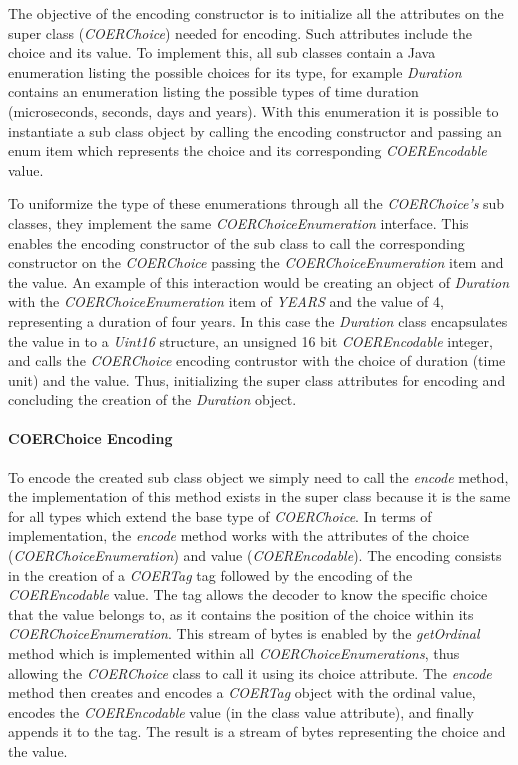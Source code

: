 The objective of the encoding constructor is to initialize all the attributes on the super class (\textit{COERChoice}) needed for encoding. Such attributes include the choice and its value. To implement this, all sub classes contain a Java enumeration listing the possible choices for its type, for example \textit{Duration} contains an enumeration listing the possible types of time duration (microseconds, seconds, days and years). With this enumeration it is possible to instantiate a sub class object by calling the encoding constructor and passing an enum item which represents the choice and its corresponding \textit{COEREncodable} value. 

To uniformize the type of these enumerations through all the \textit{COERChoice's} sub classes, they implement the same \textit{COERChoiceEnumeration} interface. This enables the encoding constructor of the sub class to call the corresponding constructor on the \textit{COERChoice} passing the \textit{COERChoiceEnumeration} item and the value. An example of this interaction would be creating an object of \textit{Duration} with the \textit{COERChoiceEnumeration} item of \textit{YEARS} and the value of 4, representing a duration of four years. In this case the \textit{Duration} class encapsulates the value in to a \textit{Uint16} structure, an unsigned 16 bit \textit{COEREncodable} integer, and calls the \textit{COERChoice} encoding contrustor with the choice of duration (time unit) and the value. Thus, initializing the super class attributes for encoding and concluding the creation of the \textit{Duration} object. 


\paragraph{COERChoice Encoding}
To encode the created sub class object we simply need to call the \textit{encode} method, the implementation of this method exists in the super class because it is the same for all types which extend the base type of \textit{COERChoice}. In terms of implementation, the \textit{encode} method works with the attributes of the choice (\textit{COERChoiceEnumeration}) and value (\textit{COEREncodable}). The encoding consists in the creation of a \textit{COERTag} tag followed by the encoding of the \textit{COEREncodable} value. The tag allows the decoder to know the specific choice that the value belongs to, as it contains the position of the choice within its \textit{COERChoiceEnumeration}. This stream of bytes is enabled by the \textit{getOrdinal} method which is implemented within all \textit{COERChoiceEnumerations}, thus allowing the \textit{COERChoice} class to call it using its choice attribute. The \textit{encode} method then creates and encodes a \textit{COERTag} object with the ordinal value, encodes the \textit{COEREncodable} value (in the class value attribute), and finally appends it to the tag. The result is a stream of bytes representing the choice and the value.

